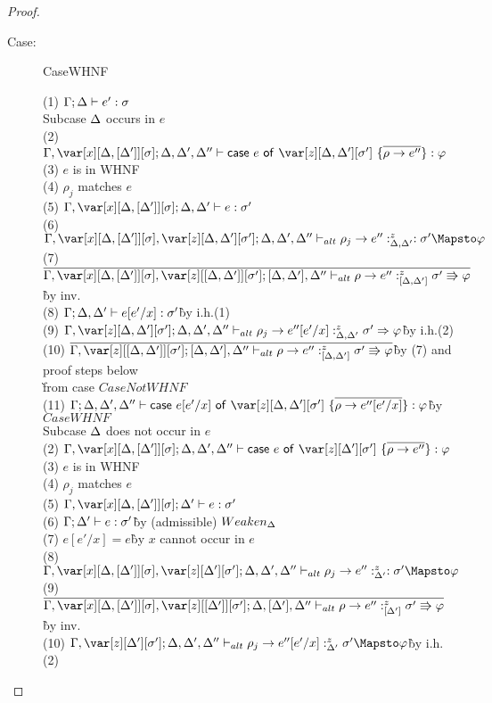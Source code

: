 \begin{proof}
\begin{description}
\item[Case:] CaseWHNF
\begin{tabbing}
    (1) $\Gamma; \Delta \vdash e' : \sigma$\\
    Subcase $\Delta$ occurs in $e$\\
    (2) $\G,\xD;\D,\D',\D'' \vdash \ccase{e}{\z[\D,\D'][\s']~\{\ov{\rho \to e''}\}} : \vp$\\
    (3) $e$ is in WHNF\\
    (4) $\rho_j$ matches $e$\\
    (5) $\G,\xD;\D,\D' \vdash e : \s'$\\
    (6) $\G,\xD,\z[\D,\D'][\s']; \D,\D',\D'' \vdash_{alt} \rho_j \to e'' :^z_{\D,\D'} : \s' \Mapsto \vp$\\
    (7) $\ov{\G,\xD,\z[\irr{\D,\D'}][\s']; [\D,\D'],\D'' \vdash_{alt} \rho \to e'' :^z_{\irr{\D,\D'}} \s'\Rrightarrow\vp}$\` by inv.\\
    (8) $\Gamma;\Delta,\Delta' \vdash e[e'/x] : \sigma'$\` by i.h.(1)\\
    (9) $\G,\z[\D,\D'][\s']; \D,\D',\D'' \vdash_{alt} \rho_j \to e''[e'/x] :^z_{\D,\D'} \s' \Rightarrow \vp$\` by i.h.(2)\\
    (10) $\ov{\G,\z[\irr{\D,\D'}][\s']; [\D,\D'],\D'' \vdash_{alt} \rho \to e'' :^z_{\irr{\D,\D'}} \s'\Rrightarrow\vp}$\` by (7) and proof steps below\\\`from case $CaseNotWHNF$\\
    (11) $\G;\D,\D',\D'' \vdash \ccase{e[e'/x]}{\z[\D,\D'][\s']~\{\ov{\rho \to e''[e'/x]}\}} : \vp$\` by $CaseWHNF$\\
    Subcase $\Delta$ does not occur in $e$\\
    (2) $\G,\xD;\D,\D',\D'' \vdash \ccase{e}{\z[\D'][\s']~\{\ov{\rho \to e''}\}} : \vp$\\
    (3) $e$ is in WHNF\\
    (4) $\rho_j$ matches $e$\\
    (5) $\G,\xD;\D' \vdash e : \s'$\\
    (6) $\Gamma;\Delta' \vdash e : \sigma'$\` by (admissible) $Weaken_\Delta$\\
    (7) $e[e'/x] = e$\` by $x$ cannot occur in $e$\\
    (8) $\G,\xD,\z[\D'][\s']; \D,\D',\D'' \vdash_{alt} \rho_j \to e'' :^z_{\D'} : \s' \Mapsto \vp$\\
    (9) $\ov{\G,\xD,\z[\irr{\D'}][\s']; \D,[\D'],\D'' \vdash_{alt} \rho \to e'' :^z_{\irr{\D'}} \s'\Rrightarrow\vp}$\` by inv.\\
    (10) $\G,\z[\D'][\s']; \D,\D',\D'' \vdash_{alt} \rho_j \to e''[e'/x] :^z_{\D'} \s' \Mapsto \vp$\` by i.h.(2)\\

\end{tabbing}
\end{description}
\end{proof}
